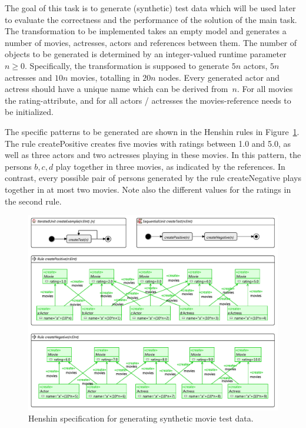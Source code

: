 \documentclass[a4paper,11pt]{article}
\begin{document}
The goal of this task is to generate (synthetic) test data which will be used
later to evaluate the correctness and the performance of the solution of the 
main task. The transformation to be implemented takes an empty model and 
generates a number of movies, actresses, actors and references between them.
The number of objects to be generated is determined by an integer-valued 
runtime parameter $n\geq0$. Specifically, the transformation is supposed
to generate $5n$ actors, $5n$ actresses and $10n$ movies, totalling in 
$20n$ nodes. Every generated actor and actress should have a unique
name which can be derived from~$n$. For all movies the rating-attribute,
and for all actors / actresses the movies-reference needs to be initialized.

The specific patterns to be generated are shown in the Henshin rules in
Figure~\ref{fig:gen-test-data}. The rule \textsf{createPositive} creates
five movies with ratings between 1.0 and 5.0, as well as three actors and 
two actresses playing in these movies. In this pattern, the persons $b,c,d$
play together in three movies, as indicated by the references. In contrast,
every possible pair of persons generated by the rule \textsf{createNegative}
plays together in at most two movies. Note also the different values for 
the ratings in the second rule.


\begin{figure}[p]
\centering
\includegraphics[width=\textwidth,angle=90]{gen-test-data2}
\caption{Henshin specification for generating synthetic movie test data.}
\label{fig:gen-test-data}
\end{figure}
\end{document}
